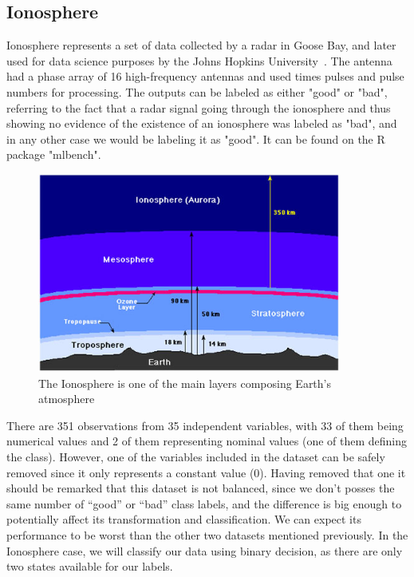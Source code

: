 \subsection{Ionosphere}
\label{subsec:Ionosphere}

Ionosphere represents a set of data collected by a radar in Goose Bay, and later used for data science purposes by the Johns Hopkins University~\cite{Sigillito1989ClassificationOR}. The antenna had a phase array of 16 high-frequency antennas and used times pulses and pulse numbers for processing. The outputs can be labeled as either "good" or "bad", referring to the fact that a radar signal going through the ionosphere and thus showing no evidence of the existence of an ionosphere was labeled as "bad", and in any other case we would be labeling it as "good". It can be found on the R package "mlbench". %
%
\begin{figure}[H]
	\centering
	\includegraphics[width=10cm]{Figuras_tfg/Ionosphere}
	\caption{The Ionosphere is one of the main layers composing Earth's atmosphere}
	\label{fig:figure_pairs_ionosp}
\end{figure}

There are 351 observations from 35 independent variables, with 33 of them being numerical values and 2 of them representing nominal values (one of them defining the class). However, one of the variables included in the dataset can be safely removed since it only represents a constant value (0). Having removed that one it should be remarked that this dataset is not balanced, since we don't posses the same number of ``good'' or ``bad'' class labels, and the difference is big enough to potentially affect its transformation and classification. We can expect its performance to be worst than the other two datasets mentioned previously. In the Ionosphere case, we will classify our data using binary decision, as there are only two states available for our labels. \par

